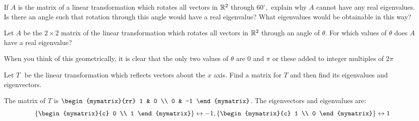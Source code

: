 \begin{enumialphparenastyle}

\begin{ex} If $A$ is the matrix of a linear transformation which rotates all
vectors in $\mathbb{R}^{2}$ through $60^{\circ },$ explain why $A$ cannot
have any real eigenvalues. Is there an angle such that rotation through this
angle would have a real eigenvalue? What eigenvalues would be obtainable in
this way? \vspace{1mm} 
\end{ex}


\begin{ex} Let $A$ be the $2\times 2$ matrix of the linear transformation which
rotates all vectors in $\mathbb{R}^{2}$ through an angle of $\theta $. For
which values of $\theta $ does $A$ have a real eigenvalue? 
\begin{sol}
When you think of this geometrically, it is clear that the only two values
of $\theta $ are 0 and $\pi $ or these added to integer multiples of $2\pi $
\end{sol}
\end{ex}


\begin{ex} Let $T\,$\ be the linear transformation which reflects vectors about
the $x$ axis. Find a matrix for $T$ and then find its eigenvalues and
eigenvectors. 
\begin{sol}
The matrix of $T$ is $\begin{mymatrix}{rr}
1 & 0 \\
0 & -1
\end{mymatrix}$. The eigenvectors and eigenvalues are:
\[
\left\{ \begin{mymatrix}{c}
0 \\
1
\end{mymatrix} \right\} \leftrightarrow -1,\left\{ \begin{mymatrix}{c}
1 \\
0
\end{mymatrix} \right\} \leftrightarrow 1
\]
\end{sol}
\end{ex}


\end{enumialphparenastyle}
